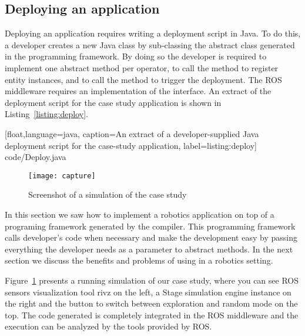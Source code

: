 \subsection{Deploying an application}

Deploying an application requires writing a deployment script in Java.
To do this, a developer creates a new Java class by sub-classing the
abstract class  generated in the programming framework.
By doing so the developer is required to implement one abstract method
per operator, to call the  method to register entity
instances, and to call the  method to trigger the
deployment. The ROS middleware requires an implementation of the
 interface. An extract of the deployment script for the
case study application is shown in Listing~\ref{listing:deploy}.

%
[float,language=java,%
caption={An extract of a developer-supplied Java deployment script for
  the case-study application},%
label={listing:deploy}]%
{code/Deploy.java}


\begin{figure}
  \centering
 \texttt{[image: capture]}
  \caption{Screenshot of a simulation of the case study}
\label{fig:diaspec-simulation}
\end{figure}

In this section we saw how to implement a robotics application on top
of a programing framework generated by the \diaspec{} compiler. This
programming framework calls developer's code when necessary and make
the development easy by passing everything the developer needs as a
parameter to abstract methods. In the next section we discuss the
benefits and problems of using \diaspec{} in a robotics setting.

Figure~\ref{fig:diaspec-simulation}  presents a running simulation of our case study, where you can see ROS sensors visualization tool rivz on the left, a Stage simulation engine instance on the right and the button to switch between exploration and random mode on the top. The code generated is completely integrated in the ROS middleware and the execution can be analyzed by the tools provided by ROS.